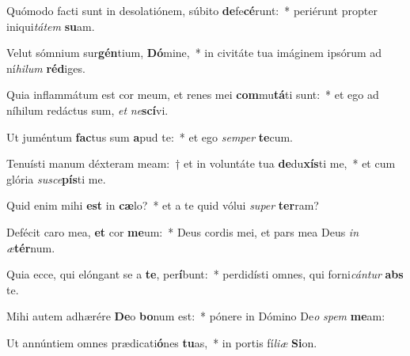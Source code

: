 \item Quómodo facti sunt in desolatiónem, súbito \textbf{de}fe\textbf{cé}runt:~* periérunt propter iniqui\textit{tá}\textit{tem} \textbf{su}am.
\item Velut sómnium sur\textbf{gén}tium, \textbf{Dó}mine,~* in civitáte tua imáginem ipsórum ad ní\textit{hi}\textit{lum} \textbf{réd}iges.
\item Quia inflammátum est cor meum, et renes mei \textbf{com}mu\textbf{tá}ti sunt:~* et ego ad níhilum redáctus sum, \textit{et} \textit{ne}\textbf{scí}vi.
\item Ut juméntum \textbf{fac}tus sum \textbf{a}pud te:~* et ego \textit{sem}\textit{per} \textbf{te}cum.
\item Tenuísti manum déxteram meam:~† et in voluntáte tua \textbf{de}du\textbf{xís}ti me,~* et cum glória \textit{su}\textit{sce}\textbf{pís}ti me.
\item Quid enim mihi \textbf{est} in \textbf{cæ}lo?~* et a te quid vólui \textit{su}\textit{per} \textbf{ter}ram?
\item Defécit caro mea, \textbf{et} cor \textbf{me}um:~* Deus cordis mei, et pars mea Deus \textit{in} \textit{æ}\textbf{tér}num.
\item Quia ecce, qui elóngant se a \textbf{te}, per\textbf{í}bunt:~* perdidísti omnes, qui forni\textit{cán}\textit{tur} \textbf{abs} te.
\item Mihi autem adhærére \textbf{De}o \textbf{bo}num est:~* pónere in Dómino De\textit{o} \textit{spem} \textbf{me}am:
\item Ut annúntiem omnes prædicati\textbf{ó}nes \textbf{tu}as,~* in portis fí\textit{li}\textit{æ} \textbf{Si}on.
